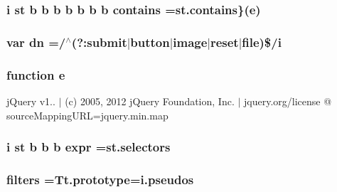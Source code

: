 \hypertarget{jquery-1_89_81_8min_8js_a17a22ba691b553d9b1678234f35338ec}{
\subsubsection[{contains}]{ {\bf i} {\bf st} {\bf b} {\bf b} {\bf b} {\bf b} {\bf b} {\bf b} {\bf b} contains =st.\-contains\}({\bf e})}}\label{jquery-1_89_81_8min_8js_a17a22ba691b553d9b1678234f35338ec}
\hypertarget{jquery-1_89_81_8min_8js_ab5e3f3e2b2507b73e2d8092caa5c8650}{
\subsubsection[{dn}]{\setlength{\rightskip}{0pt plus 5cm}var dn =/$^\wedge$(?\-:submit$\vert${\bf button}$\vert$image$\vert$reset$\vert$file)\$/{\bf i}}}\label{jquery-1_89_81_8min_8js_ab5e3f3e2b2507b73e2d8092caa5c8650}
\hypertarget{jquery-1_89_81_8min_8js_a2c038346d47955cbe2cb91e338edd7e1}{
\subsubsection[{e}]{\setlength{\rightskip}{0pt plus 5cm}function e}}\label{jquery-1_89_81_8min_8js_a2c038346d47955cbe2cb91e338edd7e1}
j\-Query v1.. $\vert$ (c) 2005, 2012 j\-Query Foundation, Inc. $\vert$ jquery.\-org/license @ source\-Mapping\-U\-R\-L=jquery.\-min.\-map \hypertarget{jquery-1_89_81_8min_8js_a8c2214cd80e7dbf3b473f3ab81d9cf23}{
\subsubsection[{expr}]{ {\bf i} {\bf st} {\bf b} {\bf b} {\bf b} expr =st.\-selectors}}\label{jquery-1_89_81_8min_8js_a8c2214cd80e7dbf3b473f3ab81d9cf23}
\hypertarget{jquery-1_89_81_8min_8js_ae69fce38b5a84b26e5078fedea5bb7c2}{
\subsubsection[{filters}]{ filters ={\bf Tt.\-prototype}=i.\-pseudos}}\label{jquery-1_89_81_8min_8js_ae69fce38b5a84b26e5078fedea5bb7c2}
